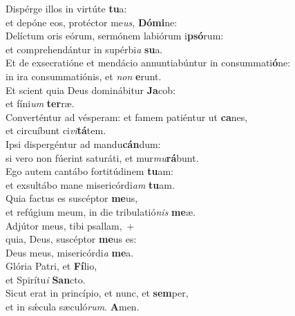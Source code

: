 \evenverse Dispérge illos in virtúte \textbf{tu}a:~\*\\
\evenverse et depóne eos, protéctor me\textit{us}, \textbf{Dó}\textbf{mi}ne:\\
\oddverse Delíctum oris eórum, sermónem labiórum i\textbf{psó}rum:~\*\\
\oddverse et comprehendántur in supérbi\textit{a} \textbf{su}a.\\
\evenverse Et de exsecratióne et mendácio annuntiabúntur in consummati\textbf{ó}ne:~\*\\
\evenverse in ira consummatiónis, et \textit{non} \textbf{e}runt.\\
\oddverse Et scient quia Deus dominábitur \textbf{Ja}cob:~\*\\
\oddverse et fíni\textit{um} \textbf{ter}ræ.\\
\evenverse Converténtur ad vésperam: et famem patiéntur ut \textbf{ca}nes,~\*\\
\evenverse et circuíbunt ci\textit{vi}\textbf{tá}tem.\\
\oddverse Ipsi dispergéntur ad mandu\textbf{cán}dum:~\*\\
\oddverse si vero non fúerint saturáti, et mur\textit{mu}\textbf{rá}bunt.\\
\evenverse Ego autem cantábo fortitúdinem \textbf{tu}am:~\*\\
\evenverse et exsultábo mane misericórdi\textit{am} \textbf{tu}am.\\
\oddverse Quia factus es suscéptor \textbf{me}us,~\*\\
\oddverse et refúgium meum, in die tribulatió\textit{nis} \textbf{me}æ.\\
\evenverse Adjútor meus, tibi psallam,~+\\
\evenverse  quia, Deus, suscéptor \textbf{me}us es:~\*\\
\evenverse Deus meus, misericórdi\textit{a} \textbf{me}a.\\
\oddverse Glória Patri, et \textbf{Fí}lio,~\*\\
\oddverse et Spirítu\textit{i} \textbf{San}cto.\\
\evenverse Sicut erat in princípio, et nunc, et \textbf{sem}per,~\*\\
\evenverse et in sǽcula sæculó\textit{rum}. \textbf{A}men.\\
